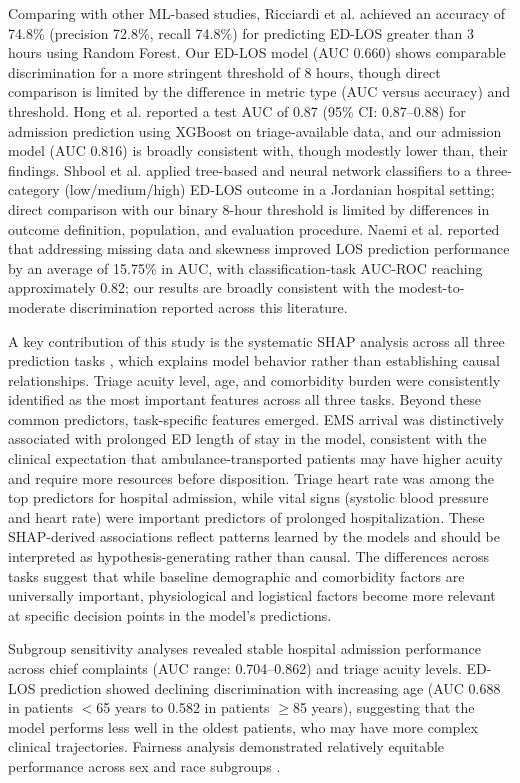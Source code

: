 \documentclass[harvard,article]{frontiersinFPHY_FAMS}
\begin{document}
Comparing with other ML-based studies, Ricciardi et al. \cite{ricciardi2024} achieved an accuracy of 74.8\% (precision 72.8\%, recall 74.8\%) for predicting ED-LOS greater than 3 hours using Random Forest. Our ED-LOS model (AUC 0.660) shows comparable discrimination for a more stringent threshold of 8 hours, though direct comparison is limited by the difference in metric type (AUC versus accuracy) and threshold. Hong et al. \cite{hong2018} reported a test AUC of 0.87 (95\% CI: 0.87--0.88) for admission prediction using XGBoost on triage-available data, and our admission model (AUC 0.816) is broadly consistent with, though modestly lower than, their findings. Shbool et al. \cite{shbool2023} applied tree-based and neural network classifiers to a three-category (low/medium/high) ED-LOS outcome in a Jordanian hospital setting; direct comparison with our binary 8-hour threshold is limited by differences in outcome definition, population, and evaluation procedure. Naemi et al. \cite{naemi2021} reported that addressing missing data and skewness improved LOS prediction performance by an average of 15.75\% in AUC, with classification-task AUC-ROC reaching approximately 0.82; our results are broadly consistent with the modest-to-moderate discrimination reported across this literature.

A key contribution of this study is the systematic SHAP analysis across all three prediction tasks \cite{slack2022, wang2025}, which explains model behavior rather than establishing causal relationships. Triage acuity level, age, and comorbidity burden were consistently identified as the most important features across all three tasks. Beyond these common predictors, task-specific features emerged. EMS arrival was distinctively associated with prolonged ED length of stay in the model, consistent with the clinical expectation that ambulance-transported patients may have higher acuity and require more resources before disposition. Triage heart rate was among the top predictors for hospital admission, while vital signs (systolic blood pressure and heart rate) were important predictors of prolonged hospitalization. These SHAP-derived associations reflect patterns learned by the models and should be interpreted as hypothesis-generating rather than causal. The differences across tasks suggest that while baseline demographic and comorbidity factors are universally important, physiological and logistical factors become more relevant at specific decision points in the model's predictions.

Subgroup sensitivity analyses revealed stable hospital admission performance across chief complaints (AUC range: 0.704--0.862) \cite{feng2026} and triage acuity levels. ED-LOS prediction showed declining discrimination with increasing age (AUC 0.688 in patients $<$65 years to 0.582 in patients $\geq$85 years), suggesting that the model performs less well in the oldest patients, who may have more complex clinical trajectories. Fairness analysis demonstrated relatively equitable performance across sex and race subgroups \cite{siddique2023, vantu2023}.
\end{document}

